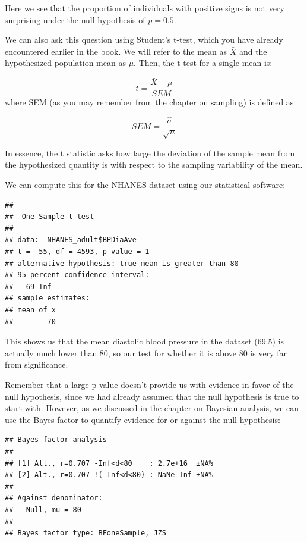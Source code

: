 \documentclass[12pt,]{book}
\newenvironment{Shaded}{\begin{snugshade}}{\end{snugshade}}
\newcommand{\DataTypeTok}[1]{\textcolor[rgb]{0.13,0.29,0.53}{#1}}
\newcommand{\DecValTok}[1]{\textcolor[rgb]{0.00,0.00,0.81}{#1}}
\newcommand{\KeywordTok}[1]{\textcolor[rgb]{0.13,0.29,0.53}{\textbf{#1}}}
\newcommand{\NormalTok}[1]{#1}
\newcommand{\OperatorTok}[1]{\textcolor[rgb]{0.81,0.36,0.00}{\textbf{#1}}}
\newcommand{\OtherTok}[1]{\textcolor[rgb]{0.56,0.35,0.01}{#1}}
\theoremstyle{definition}
\theoremstyle{definition}
\theoremstyle{definition}
\theoremstyle{remark}
\begin{document}
Here we see that the proportion of individuals with positive signs is not very surprising under the null hypothesis of \(p=0.5\).

We can also ask this question using Student's t-test, which you have already encountered earlier in the book. We will refer to the mean as \(\bar{X}\) and the hypothesized population mean as \(\mu\). Then, the t test for a single mean is:

\[
t = \frac{\bar{X} - \mu}{SEM}
\]
where SEM (as you may remember from the chapter on sampling) is defined as:

\[
SEM = \frac{\hat{\sigma}}{\sqrt{n}}
\]

In essence, the t statistic asks how large the deviation of the sample mean from the hypothesized quantity is with respect to the sampling variability of the mean.

We can compute this for the NHANES dataset using our statistical software:

\begin{verbatim}
## 
##  One Sample t-test
## 
## data:  NHANES_adult$BPDiaAve
## t = -55, df = 4593, p-value = 1
## alternative hypothesis: true mean is greater than 80
## 95 percent confidence interval:
##   69 Inf
## sample estimates:
## mean of x 
##        70
\end{verbatim}

This shows us that the mean diastolic blood pressure in the dataset (69.5) is actually much lower than 80, so our test for whether it is above 80 is very far from significance.

Remember that a large p-value doesn't provide us with evidence in favor of the null hypothesis, since we had already assumed that the null hypothesis is true to start with. However, as we discussed in the chapter on Bayesian analysis, we can use the Bayes factor to quantify evidence for or against the null hypothesis:

\begin{Shaded}
\end{Shaded}

\begin{verbatim}
## Bayes factor analysis
## --------------
## [1] Alt., r=0.707 -Inf<d<80    : 2.7e+16  ±NA%
## [2] Alt., r=0.707 !(-Inf<d<80) : NaNe-Inf ±NA%
## 
## Against denominator:
##   Null, mu = 80 
## ---
## Bayes factor type: BFoneSample, JZS
\end{verbatim}
\end{document}
